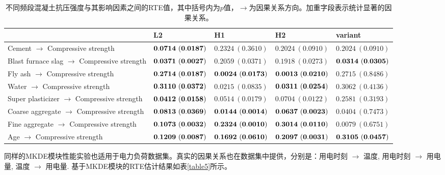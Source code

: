 \begin{table}[!ht]
\centering
\caption{不同频段混凝土抗压强度与其影响因素之间的RTE值，其中括号内为$p$值，$\rightarrow$为因果关系方向。加重字段表示统计显著的因果关系。}
\fontsize{7}{14}\selectfont
\begin{tabular}{lllll}
 \hline
   & L2 &  H1& H2 &variant \\
  \hline
  Cement $\rightarrow$ Compressive strength  & $\bf{0.0714\ (0.0187)}$ & $0.2324\ (0.3610)$&$0.2024\ (0.0910)$&$0.2024\ (0.0910)$ \\
  \hline
  Blast furnace slag $\rightarrow$ Compressive strength& $\bf{0.0371\ (0.0027)}$ & $0.2059\ (0.0371)$&$0.1918\ (0.0273)$&$\bf{0.0314\ (0.0305)}$\\
  \hline
  Fly ash $\rightarrow$ Compressive strength & $\bf{0.2714\ (0.0187)}$ & $\bf{0.0024\ (0.0173)}$&$\bf{0.0013\ (0.0210)}$&$0.2715\ (0.8486)$\\
  \hline
  Water $\rightarrow$ Compressive strength & $\bf{0.3110\ (0.0372)}$ & $0.0215\ (0.0835)$&$\bf{0.0311\ (0.0254)}$&$0.3062\ (0.4136)$\\
  \hline
  Super plasticizer $\rightarrow$ Compressive strength & $\bf{0.0412\ (0.0158)}$ & $0.0514\ (0.0179)$&$0.0704\ (0.0122)$&$0.2581\ (0.3193)$\\
  \hline
  Coarse aggregate $\rightarrow$ Compressive strength& $\bf{0.0813\ (0.0369)}$ & $\bf{0.0144\ (0.0014)}$&$\bf{0.0637\ (0.0023)}$&$0.0404\ (0.7473)$\\
  \hline
  Fine aggregate $\rightarrow$ Compressive strength& $\bf{0.1073\ (0.0032)}$ & $\bf{0.2324\ (0.0010)}$&$\bf{0.3014\ (0.0110)}$&$0.0079\ (0.6751)$\\
  \hline
  Age $\rightarrow$ Compressive strength& $\bf{0.1209\ (0.0087)}$ & $\bf{0.1692\ (0.0610)}$&$\bf{0.2097\ (0.0031)}$&$\bf{0.3105\ (0.0457)}$\\
  \hline
\end{tabular}
\label{table4}
\end{table}
同样的MKDE模块性能实验也适用于电力负荷数据集。真实的因果关系也在数据集中提供，分别是：用电时刻 $\rightarrow$ 温度, 用电时刻 $\rightarrow$ 用电量, 温度 $\rightarrow$ 用电量. 基于MKDE模块的RTE估计结果如表\ref{table5}所示。

